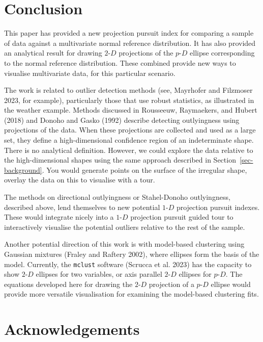 \documentclass[
  12pt,
]{interact}
\newcommand\pD{$p\text{-}D$}
\newcommand\gD{$2\text{-}D$}
\newcommand\bD{$1\text{-}D$}
\begin{document}
\section{Conclusion}\label{conclusion}

This paper has provided a new projection pursuit index for comparing a
sample of data against a multivariate normal reference distribution. It
has also provided an analytical result for drawing \gD{} projections of
the \pD{} ellipse corresponding to the normal reference distribution.
These combined provide new ways to visualise multivariate data, for this
particular scenario.

The work is related to outlier detection methods (see, Mayrhofer and
Filzmoser 2023, for example), particularly those that use robust
statistics, as illustrated in the weather example. Methods discussed in
Rousseeuw, Raymaekers, and Hubert (2018) and Donoho and Gasko (1992)
describe detecting outlyingness using projections of the data. When
these projections are collected and used as a large set, they define a
high-dimensional confidence region of an indeterminate shape. There is
no analytical definition. However, we could explore the data relative to
the high-dimensional shapes using the same approach described in
Section~\ref{sec-background}. You would generate points on the surface
of the irregular shape, overlay the data on this to visualise with a
tour.

The methods on directional outlyingness or Stahel-Donoho outlyingness,
described above, lend themselves to new potential \bD{} projection
pursuit indexes. These would integrate nicely into a \bD{} projection
pursuit guided tour to interactively visualise the potential outliers
relative to the rest of the sample.

Another potential direction of this work is with model-based clustering
using Gaussian mixtures (Fraley and Raftery 2002), where ellipses form
the basis of the model. Currently, the \texttt{mclust} software (Scrucca
et al. 2023) has the capacity to show \gD{} ellipses for two variables,
or axis parallel \gD{} ellipses for \pD{}. The equations developed here
for drawing the \gD{} projection of a \pD{} ellipse would provide more
versatile visualisation for examining the model-based clustering fits.

\section*{Acknowledgements}\label{acknowledgements}
\end{document}
